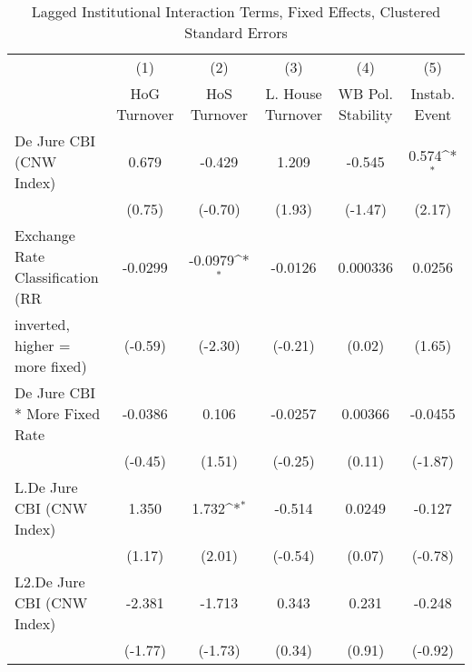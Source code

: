 \begin{table}[htbp]\centering
\def\sym#1{\ifmmode^{#1}\else\(^{#1}\)\fi}
\caption{Lagged Institutional Interaction Terms, Fixed Effects, Clustered Standard Errors \label{intlagsDJ}}
\begin{tabular}{l*{5}{c}}
\toprule
                                        &\multicolumn{1}{c}{(1)}&\multicolumn{1}{c}{(2)}&\multicolumn{1}{c}{(3)}&\multicolumn{1}{c}{(4)}&\multicolumn{1}{c}{(5)}\\
                                        &\multicolumn{1}{c}{HoG Turnover}&\multicolumn{1}{c}{HoS Turnover}&\multicolumn{1}{c}{L. House Turnover}&\multicolumn{1}{c}{WB Pol. Stability}&\multicolumn{1}{c}{Instab. Event}\\
\midrule
De Jure CBI (CNW Index)                 &    0.679         &   -0.429         &    1.209         &   -0.545         &    0.574\sym{*}  \\
                                        &   (0.75)         &  (-0.70)         &   (1.93)         &  (-1.47)         &   (2.17)         \\
\addlinespace
Exchange Rate Classification (RR        &  -0.0299         &  -0.0979\sym{*}  &  -0.0126         & 0.000336         &   0.0256         \\
inverted, higher = more fixed)          &  (-0.59)         &  (-2.30)         &  (-0.21)         &   (0.02)         &   (1.65)         \\
\addlinespace
De Jure CBI * More Fixed Rate           &  -0.0386         &    0.106         &  -0.0257         &  0.00366         &  -0.0455         \\
                                        &  (-0.45)         &   (1.51)         &  (-0.25)         &   (0.11)         &  (-1.87)         \\
\addlinespace
L.De Jure CBI (CNW Index)               &    1.350         &    1.732\sym{*}  &   -0.514         &   0.0249         &   -0.127         \\
                                        &   (1.17)         &   (2.01)         &  (-0.54)         &   (0.07)         &  (-0.78)         \\
\addlinespace
L2.De Jure CBI (CNW Index)              &   -2.381         &   -1.713         &    0.343         &    0.231         &   -0.248         \\
                                        &  (-1.77)         &  (-1.73)         &   (0.34)         &   (0.91)         &  (-0.92)         \\

\end{tabular}
\end{table}
